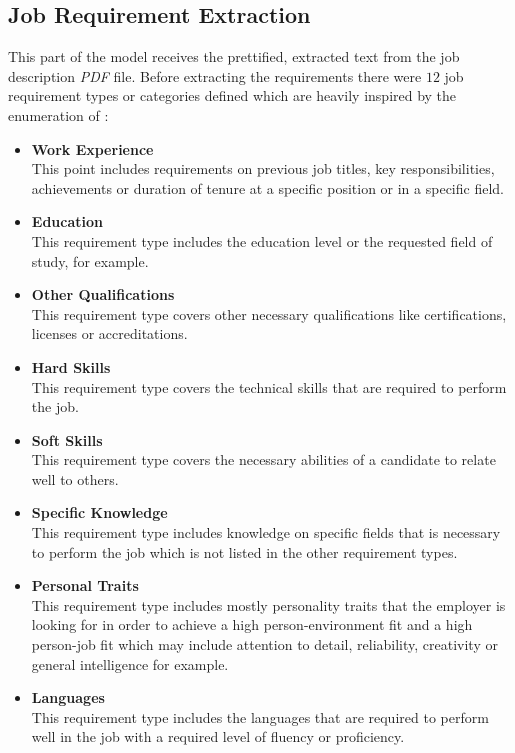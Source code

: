 \documentclass[draft,final]{thesisclass} %
\begin{document}
\subsection{Job Requirement Extraction} \label{job_requirement_extraction}
This part of the model receives the prettified, extracted text from the job description \textit{PDF} file.
Before extracting the requirements there were $12$ job requirement types or categories defined which are heavily inspired by the enumeration of \textcite{job_requirement_types}:
\begin{itemize} \label{job_requirement_types}
    \item \textbf{Work Experience}\\
    This point includes requirements on previous job titles, key responsibilities, achievements or duration of tenure at a specific position or in a specific field.
    \item \textbf{Education}\\
    This requirement type includes the education level or the requested field of study, for example.
    \item \textbf{Other Qualifications}\\
    This requirement type covers other necessary qualifications like certifications, licenses or accreditations.
    \item \textbf{Hard Skills}\\
    This requirement type covers the technical skills that are required to perform the job.
    \item \textbf{Soft Skills}\\
    This requirement type covers the necessary abilities of a candidate to relate well to others.
    \item \textbf{Specific Knowledge}\\
    This requirement type includes knowledge on specific fields that is necessary to perform the job which is not listed in the other requirement types.
    \item \textbf{Personal Traits}\\
    This requirement type includes mostly personality traits that the employer is looking for in order to achieve a high person-environment fit and a high person-job fit which may include attention to detail, reliability, creativity or general intelligence for example.
    \item \textbf{Languages}\\
    This requirement type includes the languages that are required to perform well in the job with a required level of fluency or proficiency.

\end{itemize}
\end{document}
